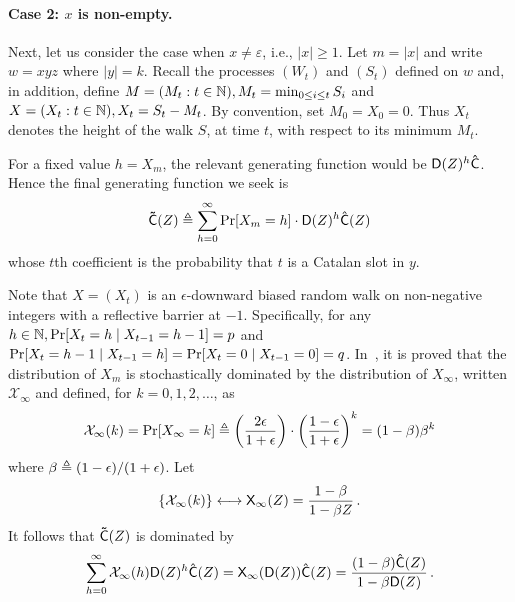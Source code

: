   \paragraph{Case 2: $x$ is non-empty.}
  Next, let us consider the case when $x \neq \varepsilon$, i.e., $|x| \geq 1$. 
  Let $m = |x|$ and write $w = xyz$ where $|y| = k$. 
  Recall the processes $(W_t)$ and $(S_t)$ defined on $w$
  and, in addition, define $M = (M_t : t \in \mathbb{N}), M_t = \min_{0 \leq i \leq t } S_i$ 
  and $X = (X_t : t \in \mathbb{N}), X_t = S_t - M_t$. 
  By convention, set $M_0 = X_0 = 0$. 
  Thus $X_t$ denotes the height of the walk $S$, at time $t$, 
  with respect to its minimum $M_t$.

  For a fixed value $h = X_m$, the relevant generating function 
  would be $\mathsf{D}(Z)^{h}\mathsf{\hat{C}}$. 
  Hence the final generating function we seek is
  $$
    \mathsf{\tilde{C}}(Z) \triangleq \sum_{h = 0}^\infty \Pr[X_m = h] \cdot \mathsf{D}(Z)^h  \mathsf{\hat{C}}(Z)
  $$
  whose $t$th coefficient is the probability that 
  $t$ is a Catalan slot in $y$.

  Note that $X = (X_t)$ is an $\epsilon$-downward biased random walk 
  on non-negative integers with a reflective barrier at $-1$. 
  Specifically, 
  for any $h \in \mathbb{N}, \Pr[X_t = h \mid X_{t-1} = h -1] = p$ and 
  $\Pr[X_t = h - 1 \mid X_{t-1} = h] = \Pr[X_t = 0 \mid X_{t-1} = 0] = q$. 
  In~\cite[Lemma 6.1]{LinearConsistencySODA}, it is proved that 
  the distribution of $X_m$ is stochastically dominated by 
  the distribution of $X_\infty$, written $\mathcal{X}_\infty$ and 
  defined, for $k = 0, 1, 2, \ldots$, as 
  \begin{equation}
    \label{eq:stationary}
      \mathcal{X}_\infty(k) = \Pr[X_\infty = k] 
      \triangleq 
        \left(\frac{2\epsilon}{1+\epsilon}\right)\cdot \left(\frac{1-\epsilon}{1 + \epsilon}\right)^k
        = 
      (1 - \beta) \beta^k
  \end{equation}
  where $\beta \triangleq (1-\epsilon)/(1+\epsilon)$. 
  Let 
  $$
    \{\mathcal{X}_\infty(k)\} \longleftrightarrow \mathsf{X}_\infty(Z) = 
    \frac{1 - \beta}{1 - \beta Z}
    \,.
  $$ 
  It follows that $\mathsf{\tilde{C}}(Z)$ is dominated by 
  $$
      \sum_{h = 0}^\infty \mathcal{X}_\infty(h) \mathsf{D}(Z)^h \mathsf{\hat{C}}(Z)
    = \mathsf{X}_\infty(\mathsf{D}(Z)) \mathsf{\hat{C}}(Z)
    = \frac{(1 - \beta)\mathsf{\hat{C}}(Z)}{1 - \beta \mathsf{D}(Z)}
    \,.
  $$

